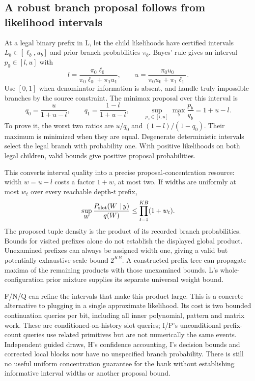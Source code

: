 \documentclass[10pt,a4paper]{article}
\begin{document}
\subsection{A robust branch proposal follows from likelihood intervals}
At a legal binary prefix in L, let the child likelihoods have certified intervals
$L_b\in[\ell_b,u_b]$ and prior branch probabilities $\pi_b$.
Bayes' rule gives an interval $p_0\in[l,u]$ with
\[
 l=\frac{\pi_0\ell_0}{\pi_0\ell_0+\pi_1u_1},\qquad
 u=\frac{\pi_0u_0}{\pi_0u_0+\pi_1\ell_1}.
\]
Use $[0,1]$ when denominator information is absent, and handle truly impossible branches by the source
constraint. The minimax proposal over this interval is
\begin{equation}
 q_0=\frac{u}{1+u-l},\qquad
 q_1=\frac{1-l}{1+u-l},\qquad
 \sup_{p_0\in[l,u]}\max_b\frac{p_b}{q_b}=1+u-l.
 \label{eq:robust-bit-guide}
\end{equation}
To prove it, the worst two ratios are $u/q_0$ and $(1-l)/(1-q_0)$.
Their maximum is minimized when they are equal. Degenerate deterministic intervals select the legal
branch with probability one. With positive likelihoods on both legal children, valid bounds give
positive proposal probabilities.

This converts interval quality into a precise proposal-concentration resource: width $w=u-l$ costs a
factor $1+w$, at most two. If widths are uniformly at most $w_t$ over every reachable depth-$t$ prefix,
\[
 \sup_W\frac{P_{\rm slot}(W\mid y)}{q(W)}
 \leq\prod_{t=1}^{KB}(1+w_t).
\]
The proposed tuple density is the product of its recorded branch probabilities.
Bounds for visited prefixes alone do not establish the displayed global product.
Unexamined prefixes can always be assigned width one, giving a valid but potentially exhaustive-scale
bound $2^{KB}$. A constructed prefix tree can propagate maxima of the remaining products with those
unexamined bounds. L's whole-configuration prior mixture supplies its separate universal weight bound.

F/N/Q can refine the intervals that make this product large. This is a concrete alternative to plugging
in a single approximate likelihood. Its cost is two bounded continuation queries per bit, including
all inner polynomial, pattern and matrix work. These are conditioned-on-history slot queries;
I/P's unconditional prefix-count queries use related primitives but are not numerically the same events.
Independent guided draws, H's confidence accounting, I's decision bounds and corrected local blocks now
have no unspecified branch probability. There is still no useful uniform concentration guarantee for
the bank without establishing informative interval widths or another proposal bound.
\end{document}
